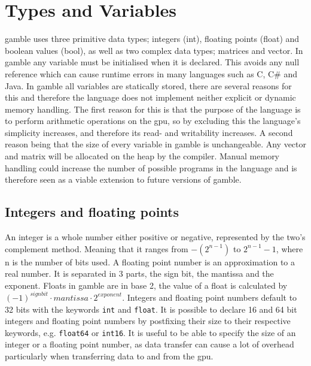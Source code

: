 \section{Types and Variables}\label{sec:Types}
\gls{gamble} uses three primitive data types; integers (int), floating points (float) and boolean values (bool), as well as two complex data types; matrices and vector. 
In \gls{gamble} any variable must be initialised when it is declared. 
This avoids any null reference which can cause runtime errors in many languages such as C, C\# and Java.
In \gls{gamble} all variables are statically stored, there are several reasons for this and therefore the language does not implement neither explicit or dynamic memory handling. 
The first reason for this is that the purpose of the language is to perform arithmetic operations on the \acrshort{gpu}, so by excluding this the language's simplicity increases, and therefore its read- and writability increases.
A second reason being that the size of every variable in \gls{gamble} is unchangeable.
Any vector and matrix will be allocated on the heap by the compiler. 
Manual memory handling could increase the number of possible programs in the language and is therefore seen as a viable extension to future versions of \gls{gamble}. 

\subsection*{Integers and floating points}
An integer is a whole number either positive or negative, represented by the two's complement method. 
Meaning that it ranges from $-(2^{n-1}) $ to $2^{n-1} - 1 $, where n is the number of bits used.
A floating point number is an approximation to a real number. 
It is separated in 3 parts, the sign bit, the mantissa and the exponent. 
Floats in \gls{gamble} are in base 2, the value of a float is calculated by $ {(-1)}^{sign bit} \cdot mantissa \cdot 2^{exponent} $. 
Integers and floating point numbers default to 32 bits with the keywords \texttt{int} and \texttt{float}. 
It is possible to declare 16 and 64 bit integers and floating point numbers by postfixing their size to their respective keywords, e.g. \texttt{float64} or \texttt{int16}. 
It is useful to be able to specify the size of an integer or a floating point number, as data transfer can cause a lot of overhead particularly when transferring data to and from the \acrshort{gpu}. 

